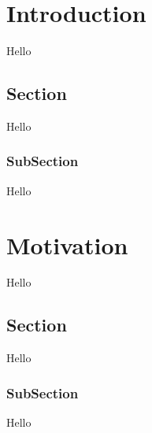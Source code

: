 \documentclass[a4paper,12pt, final]{report}
\begin{document}
\clearpage 
\renewcommand{\abstractname}{Abstract} 

\tableofcontents
  \listoffigures

\chapter{Introduction}
Hello \cite{borkar2011future}
\section{Section}
Hello
\subsection{SubSection}
Hello
\chapter{Motivation}
Hello
\section{Section}
Hello \cite{borkar2011future}
\subsection{SubSection}
Hello

{}
\end{document}

